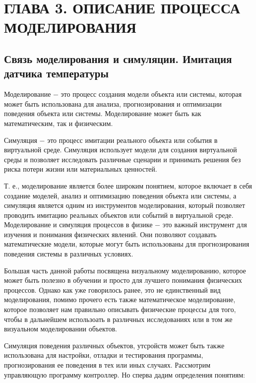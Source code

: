 \chapter{ГЛАВА 3. ОПИСАНИЕ ПРОЦЕССА МОДЕЛИРОВАНИЯ}
\label{ch:chapter3}
\section{Связь моделирования и симуляции. Имитация датчика температуры}

Моделирование $-$ это процесс создания модели объекта или системы, которая может быть использована для анализа, прогнозирования и оптимизации поведения объекта или системы. Моделирование может быть как математическим, так и физическим.

Симуляция $-$ это процесс имитации реального объекта или события в виртуальной среде. Симуляция использует модели для создания виртуальной среды и позволяет исследовать различные сценарии и принимать решения без риска потери жизни или материальных ценностей.

Т. е., моделирование является более широким понятием, которое включает в себя создание моделей, анализ и оптимизацию поведения объекта или системы, а симуляция является одним из инструментов моделирования, который позволяет проводить имитацию реальных объектов или событий в виртуальной среде. Моделирование и симуляция процессов в физике $-$ это важный инструмент для изучения и понимания физических явлений. Они позволяют создавать математические модели, которые могут быть использованы для прогнозирования поведения системы в различных условиях.

Большая часть данной работы посвящена визуальному моделированию, которое может быть полезно в обучении и просто для лучшего понимания физических процессов. Однако как уже говорилось ранее, это не единственный вид моделирования, помимо прочего есть также математическое моделирование, которое позволяет нам правильно описывать физические процессы для того, чтобы  в дальнейшем использоать в различных исследованиях или в том же визуальном моделировании объектов.

Симуляция поведения различных объектов, утсройств может быть также использована для настройки, отладки и тестирования программы, прогнозирования ее поведения в тех или иных случаях. Рассмотрим управляющую программу контроллер. Но сперва дадим определения понятиям:

